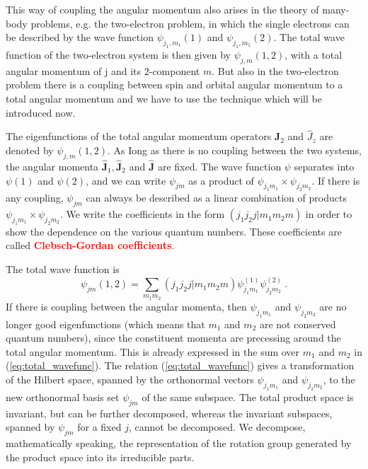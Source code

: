 \documentclass[12pt,a4paper]{article}
\renewcommand{\vec}[1]{\boldsymbol{#1}}
\newcounter{theo}[section]\setcounter{theo}{0}
\begin{document}
This way of coupling the angular momentum also arises in the theory of many-body problems, e.g. the two-electron problem, in which the single electrons can be described by the wave function $\psi_{j_1,m_1}(1)$ and $\psi_{j_1,m_1}(2)$. The total wave
function of the two-electron system is then given by $\psi_{j,m}(1,2)$, with a total angular momentum of j and its $2$-component $m$. But also in the two-electron problem there is a coupling between spin and orbital angular momentum to a total angular momentum and we have to use the technique which will be introduced now.

The eigenfunctions of the total angular momentum operators $\vec{\hat{J}}_2$ and $\hat{J}_z$ are denoted by $\psi_{j,m}(1,2)$. As Iong as there is no coupling between the two systems, the angular momenta $\vec{\hat{J}}_1, \vec{\hat{J}}_2$ and $\vec{\hat{J}}$ are fixed. The wave function $\psi$ separates into $\psi(1)$ and $\psi(2)$, and we can write $\psi_{jm}$ as a product of $\psi_{j_1 m_1} \times \psi_{j_2 m_2}$. If there is any coupling, $\psi_{jm}$ can always be described as a linear combination of products $\psi_{j_1 m_1} \times \psi_{j_2 m_2}$. We write the coefficients in the form $(j_1 j_2 j |m_1m_2m)$ in order to show the dependence on the various quantum numbers. These coefficients are called \textcolor{red}{\bf Clebsch-Gordan coefficients}.

The total wave function is
\begin{equation}
\psi_{jm} (1,2) = \sum_{m_1m_2} (j_1 j_2 j |m_1m_2m) \psi_{j_1 m_1}^{(1)} \psi_{j_2 m_2}^{(2)}  ~.
\label{eq:total_wavefunc}
\end{equation}
If there is coupling between the angular momenta, then $\psi_{j_1 m_1}$ and $\psi_{j_2 m_2}$ are no longer good eigenfunctions (which means that $m_1$ and $m_2$ are not conserved quantum numbers), since the constituent momenta are precessing around the total angular momentum. This is already expressed in the sum over $m_1$ and $m_2$ in (\ref{eq:total_wavefunc}). The relation (\ref{eq:total_wavefunc}) gives a transformation of the Hilbert space, spanned by the orthonormal vectors $\psi_{j_1 m_1}$ and $\psi_{j_2 m_2}$, to the new orthonormal basis set $\psi_{j m}$ of the same subspace. The total product space is invariant, but can be further decomposed, whereas the invariant subspaces, spanned by $\psi_{j m}$ for a fixed $j$, cannot be decomposed. We decompose, mathematically speaking, the representation of the rotation group generated by the product space into its irreducible parts. 
\end{document}
